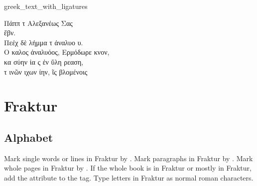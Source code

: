 \begin{sampleImage}{greek_text_with_ligatures}
\begin{typeGreek}
Πάππ τ Αλεξανέως Σας  \\
ἕβν. \\
Πεέχ δὲ λήμμα τ ἀναλυο υ. \\
Ο καλος ἀναλυόος, Ερμόδωρε κνον,  \\
κα σύην ἰα ς ἐν ὕλη ρεαση,  \\
 τ  ινῶν ιχων ίην, ῖς βλομένοις  \\
\someText {}
\end{typeGreek}
\end{sampleImage}


\section{Fraktur}
\label{section fraktur}

\tocspace
\subsection{Alphabet}
\label{section fraktur alphabet}


\begin{mainrule}
Mark single words or lines in Fraktur by . Mark paragraphs in Fraktur by . Mark whole pages in Fraktur by . If the whole book is in Fraktur or mostly in Fraktur, add the  attribute to the  tag. Type letters in Fraktur as normal roman characters.
\end{mainrule}

